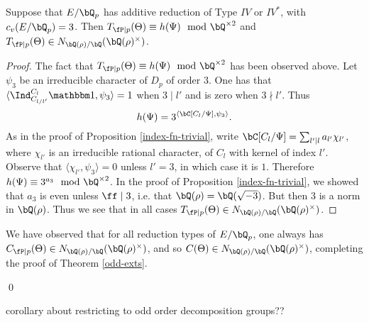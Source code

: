 \begin{prop}
   Suppose that $E / \bQ_p$ has additive reduction of Type $IV$ or $IV^*$, with $c_v(E / \bQ_p) = 3$.  Then $T_{\fP \mid p}(\Theta) \equiv h(\Psi) \mod \bQ^{\times 2}$ and $T_{\fP \mid p}(\Theta) \in \fieldnorm{\rho}$. 
\end{prop}

\begin{proof}
The fact that $T_{\fP \mid p}(\Theta) \equiv h(\Psi) \mod \bQ^{\times 2}$ has been observed above.
Let $\psi_3$ be an irreducible character of $D_p$ of order $3$. One has that $ \langle \Ind_{C_{l / l'}}^{C_l} \trivial , \psi_3 \rangle =  1$ when $3 \mid l'$ and is zero when  $3 \nmid l'$. 
Thus $$h(\Psi) = 3^{\langle \bC[C_l / \Psi], \psi_3 \rangle}.$$ As in the proof of Proposition \ref{index-fn-trivial}, write $\bC[C_l / \Psi] = \sum_{l' \mid l} a_{l'} \chi_{l'}$, where $\chi_{l'}$ is an irreducible rational character, of $C_l$ with kernel of index $l'$. Observe that $\langle \chi_{l'}, \psi_3 \rangle = 0$ unless $l' = 3$, in which case it is $1$. Therefore $h(\Psi) \equiv 3^{a_3} \mod \bQ^{\times 2}$. In the proof of Proposition \ref{index-fn-trivial}, we showed that $a_3$ is even unless $\ff \mid 3$,  i.e. that $\bQ(\rho) = \bQ(\sqrt{-3})$. But then $3$ is a norm in $\bQ(\rho)$. Thus we see that in all cases $T_{\fP \mid p}(\Theta) \in N_{\bQ(\rho) / \bQ}(\bQ(\rho)^{\times})$. 
\end{proof}

We have observed that for all reduction types of $E / \bQ_p$, one always has $C_{\fP \mid p} (\Theta) \in \fieldnorm{\rho}$, and so $C(\Theta) \in \fieldnorm{\rho}$, completing the proof of Theorem \ref{odd-exts}.

\qed

{\color{red} corollary about restricting to odd order decomposition groups??}
